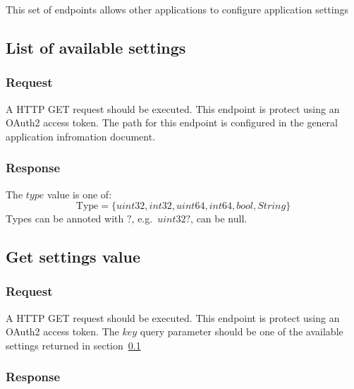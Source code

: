 This set of endpoints allows other applications to configure application settings

\subsection{List of available settings}
\label{subsec:list-of-available-settings}

\subsubsection{Request}
A HTTP GET request should be executed.
This endpoint is protect using an OAuth2 access token.
The path for this endpoint is configured in the general application infromation document.



\subsubsection{Response}

The $type$ value is one of:
\begin{equation}
    \label{eq:response-list-of-available-settings}
    \text{Type} = \{uint32, int32, uint64, int64, bool, String\}
\end{equation}
Types can be annoted with $?$, e.g.\ $uint32?$, can be null.




\subsection{Get settings value}
\label{subsec:get-settings-value}

\subsubsection{Request}

A HTTP GET request should be executed.
This endpoint is protect using an OAuth2 access token.
The $key$ query parameter should be one of the available settings returned in section\ \ref{subsec:list-of-available-settings}



\subsubsection{Response}

